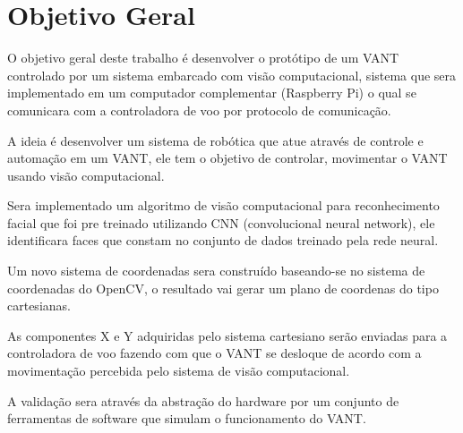 
\section{Objetivo Geral}
O objetivo geral deste trabalho é desenvolver o protótipo de um VANT controlado por um sistema embarcado com visão computacional, sistema que sera implementado em um computador complementar (Raspberry Pi) o qual se comunicara com a controladora de voo por protocolo de comunicação.

A ideia é desenvolver um sistema de robótica que atue através de controle e automação em um VANT, ele tem o objetivo de controlar, movimentar o VANT usando visão computacional.   

Sera implementado um algoritmo de visão computacional para reconhecimento facial que foi pre treinado utilizando CNN (convolucional neural network), ele identificara faces que constam no conjunto de dados treinado pela rede neural.

Um novo sistema de coordenadas sera construído baseando-se no sistema de coordenadas do OpenCV, o resultado vai gerar um plano de coordenas do tipo cartesianas.

As componentes X e Y adquiridas pelo sistema cartesiano serão enviadas para a controladora de voo fazendo com que o VANT se desloque de acordo com a movimentação percebida pelo sistema de visão computacional.  

A validação sera através da abstração do hardware por um conjunto de ferramentas de software que simulam o funcionamento do VANT.

